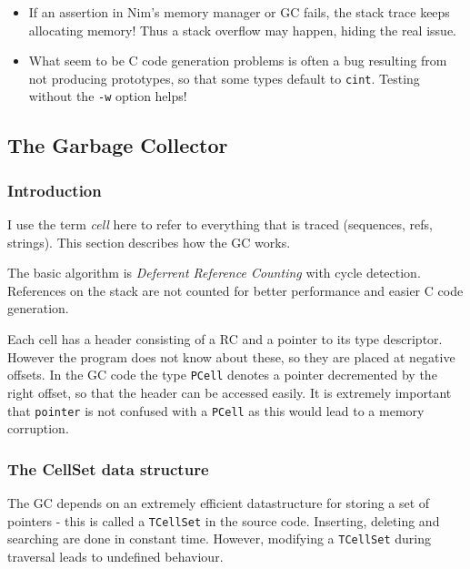 \begin{itemize}
\tightlist
\item
  If an assertion in Nim's memory manager or GC fails, the stack trace
  keeps allocating memory! Thus a stack overflow may happen, hiding the
  real issue.
\item
  What seem to be C code generation problems is often a bug resulting
  from not producing prototypes, so that some types default to
  \texttt{cint}. Testing without the \texttt{-w} option helps!
\end{itemize}

\hypertarget{the-garbage-collector}{%
\subsection{The Garbage Collector}\label{the-garbage-collector}}

\hypertarget{introduction}{%
\subsubsection{Introduction}\label{introduction}}

I use the term \emph{cell} here to refer to everything that is traced
(sequences, refs, strings). This section describes how the GC works.

The basic algorithm is \emph{Deferrent Reference Counting} with cycle
detection. References on the stack are not counted for better
performance and easier C code generation.

Each cell has a header consisting of a RC and a pointer to its type
descriptor. However the program does not know about these, so they are
placed at negative offsets. In the GC code the type \texttt{PCell}
denotes a pointer decremented by the right offset, so that the header
can be accessed easily. It is extremely important that \texttt{pointer}
is not confused with a \texttt{PCell} as this would lead to a memory
corruption.

\hypertarget{the-cellset-data-structure}{%
\subsubsection{The CellSet data
structure}\label{the-cellset-data-structure}}

The GC depends on an extremely efficient datastructure for storing a set
of pointers - this is called a \texttt{TCellSet} in the source code.
Inserting, deleting and searching are done in constant time. However,
modifying a \texttt{TCellSet} during traversal leads to undefined
behaviour.

